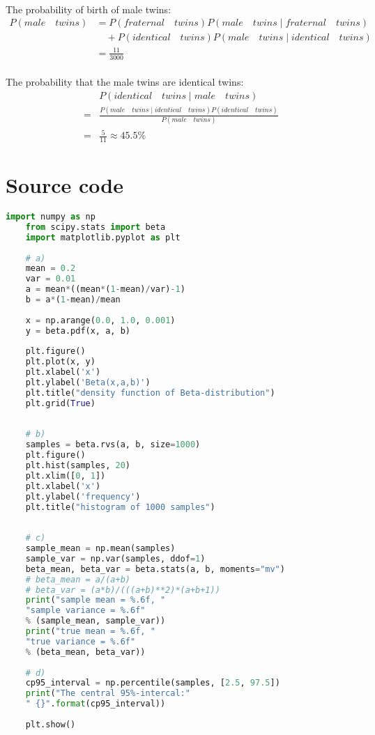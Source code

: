 \documentclass{article}
\begin{document}
  	\paragraph{}The probability of birth of male twins:
  	 \begin{equation*}
  	  \begin{aligned}
  	 	P(male \quad twins)&=P(fraternal \quad twins)P(male \quad twins \mid fraternal \quad twins)\\
  	 	& \quad +P(identical \quad twins)P(male \quad twins \mid identical \quad twins) \\
  	 	&= \frac{11}{3000}
  	  \end{aligned}
	 \end{equation*}
	\paragraph{}The probability that the male twins are identical twins:
	\begin{equation*}
	 \begin{aligned}
	 &P(identical \quad twins \mid male \quad twins)\\
	 =&\frac{P(male \quad twins \mid identical \quad twins)P(identical \quad twins)}{P(male \quad twins)}\\
	 		=& \frac{5}{11} \approx 45.5\%
	 \end{aligned}		
	\end{equation*}

 \clearpage
 \appendix
 \section* {{\large Source code}}
	\begin{lstlisting}[language=python]
	import numpy as np
	from scipy.stats import beta
	import matplotlib.pyplot as plt
	
	# a)
	mean = 0.2
	var = 0.01
	a = mean*((mean*(1-mean)/var)-1)
	b = a*(1-mean)/mean
	
	x = np.arange(0.0, 1.0, 0.001)
	y = beta.pdf(x, a, b)
	
	plt.figure()
	plt.plot(x, y)
	plt.xlabel('x')
	plt.ylabel('Beta(x,a,b)')
	plt.title("density function of Beta-distribution")
	plt.grid(True)
	
	
	# b)
	samples = beta.rvs(a, b, size=1000)
	plt.figure()
	plt.hist(samples, 20)
	plt.xlim([0, 1])
	plt.xlabel('x')
	plt.ylabel('frequency')
	plt.title("histogram of 1000 samples")
	
	
	# c)
	sample_mean = np.mean(samples)
	sample_var = np.var(samples, ddof=1)
	beta_mean, beta_var = beta.stats(a, b, moments="mv")
	# beta_mean = a/(a+b)
	# beta_var = (a*b)/(((a+b)**2)*(a+b+1))
	print("sample mean = %.6f, "
	"sample variance = %.6f"
	% (sample_mean, sample_var))
	print("true mean = %.6f, "
	"true variance = %.6f"
	% (beta_mean, beta_var))
	
	# d)
	cp95_interval = np.percentile(samples, [2.5, 97.5])
	print("The central 95%-intercal:" 
	" {}".format(cp95_interval))
	
	plt.show()
	
	\end{lstlisting}
\end{document}
